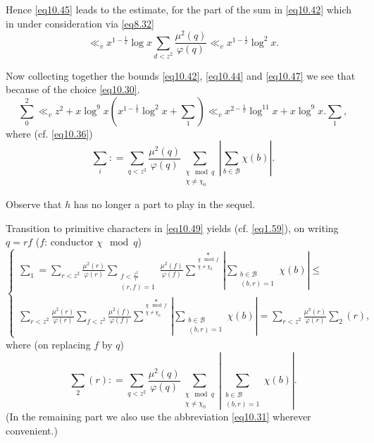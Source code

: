 Hence \eqref{eq10.45} leads to the estimate, for the part of the sum
in \eqref{eq10.42} which in under consideration via \eqref{eq8.32} 
\begin{equation*}
\ll_v x^{1- \frac{1}{v}} \log x \sum_{d < z^2} \frac{\mu^2
  (q)}{\varphi (q)} \ll_v x^{1-\frac{1}{v}} \log ^2
x. \tag{10.47}\label{eq10.47}  
\end{equation*}

Now collecting together the bounds \eqref{eq10.42}, \eqref{eq10.44}
and \eqref{eq10.47} we see that because of the choice
\eqref{eq10.30}. 
\begin{equation*}
\sum_0^2 \ll_v z^2 + x \log^9 x(x ^{1-\frac{1}{v}} \log ^2 x + \sum_1)
\ll_v x^{2- \frac{1}{v}} \log^{11} x+x \log ^9 x. \sum_1,
\tag{10.48}\label{eq10.48}  
\end{equation*}
where (cf. \eqref{eq10.36})
\begin{equation*}
\sum_i : = \sum_{q < z^2} \frac{\mu^2 (q)}{\varphi (q)}
\sum_{\substack{\chi \mod q \\ \chi \neq \chi_0}} | \sum_{b \in
  \mathscr{B}} \chi(b)|. \tag{10.49}\label{eq10.49}  
\end{equation*}

Observe that $h$ has no longer a part to play in the sequel.

Transition to primitive characters in \eqref{eq10.49} yields
(cf. \eqref{eq1.59}), 
on writing $q=rf$ ($f$: conductor $\chi \mod q$) 
\begin{equation*}
\begin{cases}
\sum_1 = \sum\limits_{r <z^2} \frac{\mu^2 (r) }{\varphi (r)}
\sum\limits_{\substack{f< \frac{z^2}{r} \\ (r,f)=1}} \frac{\mu^2
  (f)}{\varphi (f)} \sum^*\limits_{\substack{\chi \mod f \\ \chi \neq
    \chi_0}} | \sum\limits_{\substack{b \in \mathscr{B} \\(b,r)=1}}
\chi(b) | \leq \\ \sum\limits_{r < z^2} \frac{\mu^2 (r)}{\varphi (r)}
\sum\limits_{f < z^2}\frac{\mu^2 (f)}{\varphi
  (f)}\sum^*\limits_{\substack{\chi \mod f \\ \chi \neq \chi_0}} |
\sum\limits_{\substack{b \in \mathscr{B} \\(b,r)=1}} \chi (b)| =
\sum\limits_{r < z^2} \frac{\mu^2 (r)}{\varphi (r)} \sum_2 (r),  
\end{cases}\tag{10.50}\label{eq10.50}
\end{equation*}
where (on replacing $f$ by $q$)
\begin{equation*}
\sum_2 (r) : = \sum_{q < z^2} \frac{\mu^2 (q)}{\varphi (q)}
\sum_{\substack{\chi \mod q \\ \chi \neq \chi_0}} | \sum_{\substack{b
    \in \mathscr{B}\\(b,r)=1}} \chi (b)|.\tag{10.51}\label{eq10.51} 
\end{equation*}
(In the remaining part we also use the abbreviation \eqref{eq10.31}
wherever convenient.)  

